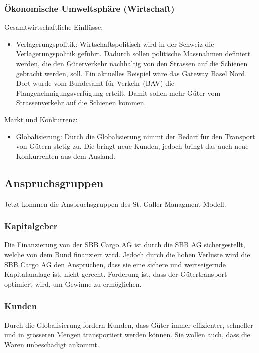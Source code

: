 \documentclass{article}
\begin{document}
\subsubsection{Ökonomische Umweltsphäre (Wirtschaft)}
Gesamtwirtschaftliche Einflüsse:
\begin{itemize}
    \item Verlagerungspolitik:
    Wirtschaftspolitisch wird in der Schweiz die Verlagerungspolitik geführt.
    Dadurch sollen politische Massnahmen definiert werden, die den Güterverkehr nachhaltig von den Strassen auf die Schienen gebracht werden, soll.
    Ein aktuelles Beispiel wäre das Gateway Basel Nord.
    Dort wurde vom Bundesamt für Verkehr (BAV) die Plangenehmigungsverfügung erteilt.
    Damit sollen mehr Güter vom Strassenverkehr auf die Schienen kommen.
\end{itemize}
Markt und Konkurrenz:
\begin{itemize}
    \item Globalisierung:
    Durch die Globalisierung nimmt der Bedarf für den Transport von Gütern stetig zu.
    Die bringt neue Kunden, jedoch bringt das auch neue Konkurrenten aus dem Ausland. 
\end{itemize}

\subsection{Anspruchsgruppen}

Jetzt kommen die Anspruchsgruppen des St. Galler Managment-Modell.

\subsubsection{Kapitalgeber}
Die Finanzierung von der SBB Cargo AG ist durch die SBB AG sichergestellt, welche von dem Bund finanziert wird.
Jedoch durch die hohen Verluste wird die SBB Cargo AG den Ansprüchen, dass sie eine sichere und wertseigernde Kapitalanalage ist, nicht gerecht.
Forderung ist, dass der Gütertransport optimiert wird, um Gewinne zu ermöglichen.

\subsubsection{Kunden}
Durch die Globalisierung fordern Kunden, dass Güter immer effizienter, schneller und in grösseren Mengen transportiert werden können.
Sie wollen auch, dass die Waren unbeschädigt ankommt.
\end{document}

